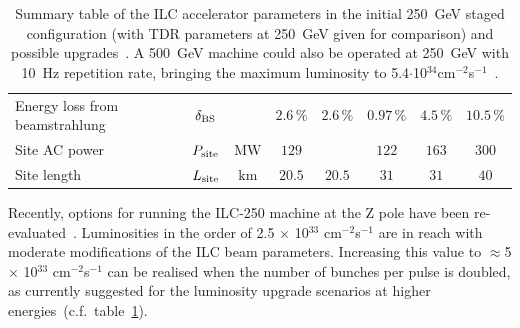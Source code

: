 \begin{table}[tbhp]
\begin{adjustbox}{width=1.\textwidth,center=\textwidth}
\begin{tabular}{lccccccc}
Energy loss from beamstrahlung  & $\delta_{\mathrm{BS}}$ &  & $2.6\,\%$  & $2.6\,\%$  & $0.97\,\%$  & $4.5\,\%$ & $10.5\,\%$ \\
Site AC power  & $P_{\mathrm{{site}}}$ &  ${\mathrm{MW}}$ & $129$ & & $122$ & $163$ & $300$ \\
Site length & $L_{\mathrm{{site}}}$ &  ${\mathrm{km}}$ & $20.5$ & $20.5$ & $31$ & $31$ & $40$ \\
\end{tabular}
\caption{Summary table of the ILC accelerator parameters in the initial 250~GeV staged configuration (with TDR parameters at 250~GeV given for comparison) and possible upgrades~\cite{Bambade:2019fyw}. A 500~GeV machine could also be operated at 250~GeV with 10~Hz repetition rate, bringing the maximum luminosity to 5.4$\cdot$10$^{34}$cm$^{-2}$s$^{-1}$~\cite{Harrison:2013nva}.
\label{tab:ilc-params}}
\end{adjustbox}
\end{table}

Recently, options for running the ILC-250 machine at the Z pole have been re-evaluated~\cite{Yokoya:2019rhx}. Luminosities in the order of 2.5 $\times$ 10$^{33}$ cm$^{-2}$s$^{-1}$ are in reach with moderate modifications of the ILC beam parameters. Increasing this value to $\approx$5 $\times$ 10$^{33}$ cm$^{-2}$s$^{-1}$ can be realised when the number of bunches per pulse is doubled, as currently suggested for the luminosity upgrade scenarios at higher energies~(c.f.~table~\ref{tab:ilc-params}).

